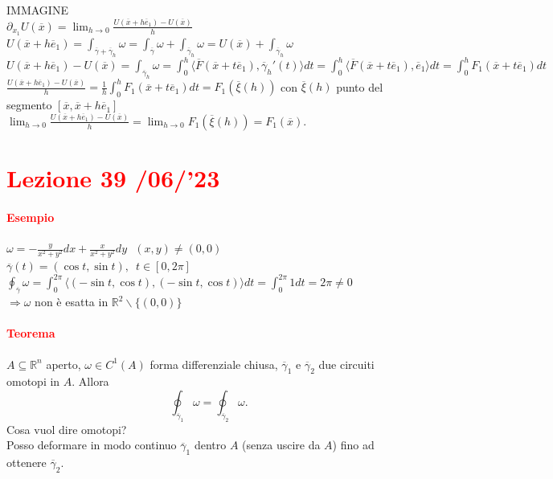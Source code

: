 \documentclass{article}
\newcommand{\R}{\mathbb{R}}
\begin{document}
IMMAGINE\\
$\partial_{x_1}U(\overline{x})= \lim_{h\rightarrow 0}\frac{U(\overline{x}+h\overline{e}_1)-U(\overline{x})}{h}$\\
$U(\overline{x} + h \overline{e}_1 )=\int_{\overline{\gamma}+\overline{\gamma}_h}\omega=\int_{\overline{\gamma}}\omega+\int_{\overline{\gamma}_h}\omega= U(\overline{x})+\int_{\overline{\gamma}_h}\omega$\\
$U(\overline{x}+h \overline{e}_1)-U(\overline{x})=\int_{\overline{\gamma}_h}\omega=\int_0^h\langle \overline{F}(\overline{x}+t\overline{e}_1),\overline{\gamma}_h'(t)\rangle dt = \int_0^h \langle \overline{F}(\overline{x}+t\overline{e}_1),\overline{e}_1 \rangle dt = \int_0^h F_1(\overline{x}+t\overline{e}_1)dt$\\
$\frac{U(\overline{x}+h\overline{e}_1)-U(\overline{x})}{h}=\frac{1}{h}\int_0^h F_1(\overline{x}+t\overline{e}_1)dt=F_1(\overline{\xi}(h))$ con $\overline{\xi}(h)$ punto del segmento $[\overline{x},\overline{x}+h\overline{e}_1]$\\
$\lim_{h\rightarrow 0} \frac{U(\overline{x}+h\overline{e}_1)-U(\overline{x})}{h}=\lim_{h\rightarrow 0} F_1 (\overline{\xi}(h))=F_1(\overline{x})$.
\begin{flushright}
    \Lightning
\end{flushright}
 
\newpage
\section{\textcolor{red}{Lezione 39 \space{}/06/'23}}
\paragraph{\textcolor{red}{Esempio}}
$\omega= -\frac{y}{x^2+y^2} dx +\frac{x}{x^2+y^2}dy\,\,\,\, (x,y)\neq (0,0)$\\
$\overline{\gamma}(t)=(\cos t, \sin t),\,\,\, t \in [0,2\pi]$\\
$\oint_{\overline{\gamma}}\omega =\int_0^{2\pi}\langle (-\sin t, \cos t),(-\sin t , \cos t) \rangle dt = \int_0^{2\pi} 1dt=2\pi\neq 0$\\
$\Rightarrow \omega$ non è esatta in  $\R^2 \backslash \{(0,0)\}$

\paragraph{\textcolor{red}{Teorema}}
$A \subseteq \R^n$ aperto, $\omega \in C^1(A)$ forma differenziale chiusa, $\overline{\gamma}_1$ e $\overline{\gamma}_2$ due circuiti omotopi in $A$. Allora
\begin{equation*}
    \oint_{\overline{\gamma}_1}\omega=\oint_{\overline{\gamma}_2}\omega.
\end{equation*}
Cosa vuol dire omotopi?\\
Posso deformare in modo continuo $\overline{\gamma}_1$ dentro $A$ (senza uscire da $A$) fino ad ottenere $\overline{\gamma}_2$.
\end{document}
